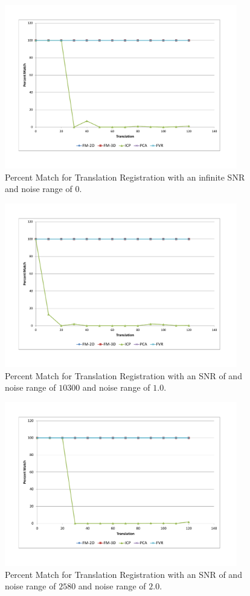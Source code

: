 \begin{figure}[!htb]
\centering
\includegraphics[width=4.0in]{images/results/noise/TransNoise0}
\caption{Percent Match for Translation Registration with an infinite SNR and noise range of $0$.}
\label{fig:TNoise0}
\end{figure}


\begin{figure}[!htb]
\centering
\includegraphics[width=4.0in]{images/results/noise/TransNoise1}
\caption{Percent Match for Translation Registration with an SNR of and noise range of $10300$ and noise range of $1.0$.}
\label{fig:TNoise1}
\end{figure}


\begin{figure}[!htb]
\centering
\includegraphics[width=4.0in]{images/results/noise/TransNoise2}
\caption{Percent Match for Translation Registration with an SNR of and noise range of $2580$ and noise range of $2.0$.}
\label{fig:TNoise2}
\end{figure}